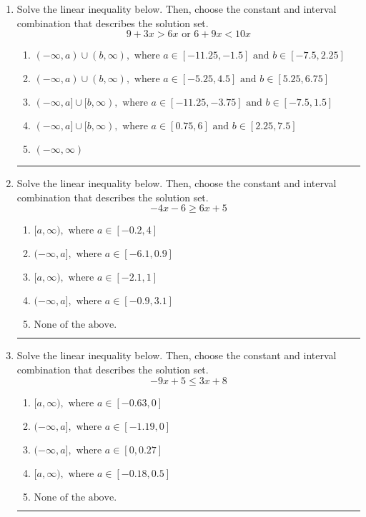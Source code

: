 \documentclass[14pt]{extbook}
\newcommand{\litem}[1]{\item#1\hspace*{-1cm}\rule{\textwidth}{0.4pt}}
\begin{document}
\begin{enumerate}
{\begin{enumerate}[label=\Alph*.]
\end{enumerate} }
\litem{
Solve the linear inequality below. Then, choose the constant and interval combination that describes the solution set.\[ 9 + 3 x > 6 x \text{ or } 6 + 9 x < 10 x \]\begin{enumerate}[label=\Alph*.]
\item \( (-\infty, a) \cup (b, \infty), \text{ where } a \in [-11.25, -1.5] \text{ and } b \in [-7.5, 2.25] \)
\item \( (-\infty, a) \cup (b, \infty), \text{ where } a \in [-5.25, 4.5] \text{ and } b \in [5.25, 6.75] \)
\item \( (-\infty, a] \cup [b, \infty), \text{ where } a \in [-11.25, -3.75] \text{ and } b \in [-7.5, 1.5] \)
\item \( (-\infty, a] \cup [b, \infty), \text{ where } a \in [0.75, 6] \text{ and } b \in [2.25, 7.5] \)
\item \( (-\infty, \infty) \)

\end{enumerate} }
\litem{
Solve the linear inequality below. Then, choose the constant and interval combination that describes the solution set.\[ -4x -6 \geq 6x + 5 \]\begin{enumerate}[label=\Alph*.]
\item \( [a, \infty), \text{ where } a \in [-0.2, 4] \)
\item \( (-\infty, a], \text{ where } a \in [-6.1, 0.9] \)
\item \( [a, \infty), \text{ where } a \in [-2.1, 1] \)
\item \( (-\infty, a], \text{ where } a \in [-0.9, 3.1] \)
\item \( \text{None of the above}. \)

\end{enumerate} }
\litem{
Solve the linear inequality below. Then, choose the constant and interval combination that describes the solution set.\[ -9x + 5 \leq 3x + 8 \]\begin{enumerate}[label=\Alph*.]
\item \( [a, \infty), \text{ where } a \in [-0.63, 0] \)
\item \( (-\infty, a], \text{ where } a \in [-1.19, 0] \)
\item \( (-\infty, a], \text{ where } a \in [0, 0.27] \)
\item \( [a, \infty), \text{ where } a \in [-0.18, 0.5] \)
\item \( \text{None of the above}. \)


\end{enumerate}}
\end{enumerate}
\end{document}
